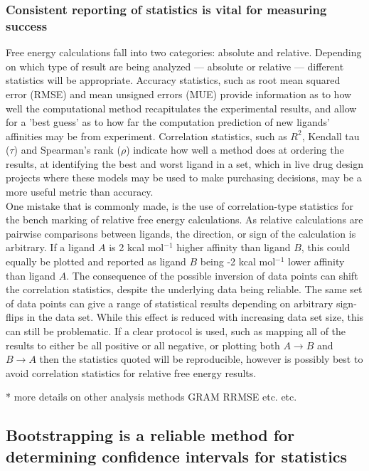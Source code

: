 \documentclass[9pt,bestpractices]{livecoms}
\begin{document}
\subsubsection{Consistent reporting of statistics is vital for measuring success}
\label{sec:statistical_analysis}
Free energy calculations fall into two categories: absolute and relative. Depending on which type of result are being analyzed --- absolute or relative --- different statistics will be appropriate. Accuracy statistics, such as root mean squared error (RMSE) and mean unsigned errors (MUE) provide information as to how well the computational method recapitulates the experimental results, and allow for a 'best guess' as to how far the computation prediction of new ligands' affinities may be from experiment. Correlation statistics, such as $R^{2}$, Kendall tau ($\tau$) and Spearman's rank ($\rho$) indicate how well a method does at ordering the results, at identifying the best and worst ligand in a set, which in live drug design projects where these models may be used to make purchasing decisions, may be a more useful metric than accuracy.\\

One mistake that is commonly made, is the use of correlation-type statistics for the bench marking of relative free energy calculations. As relative calculations are pairwise comparisons between ligands, the direction, or sign of the calculation is arbitrary. If a ligand $A$ is 2 kcal mol$^{-1}$ higher affinity than ligand $B$, this could equally be plotted and reported as ligand $B$ being -2 kcal mol$^{-1}$ lower affinity than ligand $A$. The consequence of the possible inversion of data points can shift the correlation statistics, despite the underlying data being reliable. The same set of data points can give a range of statistical results depending on arbitrary sign-flips in the data set. While this effect is reduced with increasing data set size, this can still be problematic. If a clear protocol is used, such as mapping all of the results to either be all positive or all negative, or plotting both $A \rightarrow B$ and $B \rightarrow A$ then the statistics quoted will be reproducible, however is possibly best to avoid correlation statistics for relative free energy results.

* more details on other analysis methods GRAM RRMSE etc. etc. 

\subsection{Bootstrapping is a reliable method for determining confidence intervals for statistics}
\end{document}
